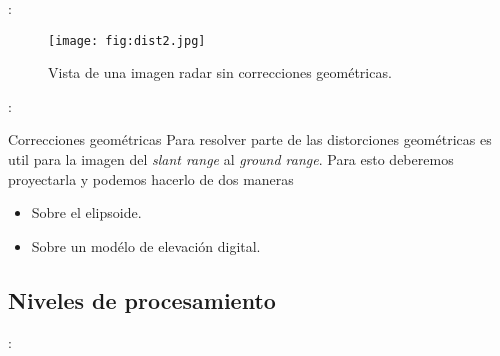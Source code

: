 \begin{frame}{\secname : \subsecname}
    \begin{figure}
      \centering
      \texttt{[image: fig:dist2.jpg]}
      \caption{Vista de una imagen radar sin correcciones geométricas.}
      \label{}
    \end{figure}
\end{frame}

\begin{frame}{\secname : \subsecname}
  \begin{block}{Correcciones geométricas}
    Para resolver parte de las distorciones geométricas es util para la imagen del \emph{slant range} al \emph{ground range}. Para esto deberemos proyectarla y podemos hacerlo de dos maneras
    \begin{itemize}
      \item Sobre el elipsoide.
      \item Sobre un modélo de elevación digital.
    \end{itemize}
  \end{block}
\end{frame}

\subsection{Niveles de procesamiento}
\begin{frame}{\secname : \subsecname}
  \begin{table}[]
  \centering
  \caption{Niveles de procesamiento típicos para una imagen SAR.}
  \label{my-label}
  \end{table}
\end{frame}
